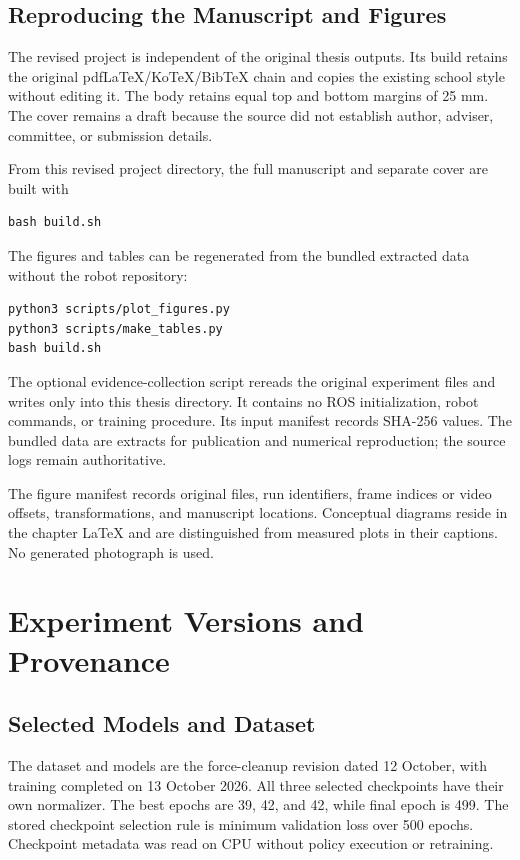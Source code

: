 \section{Reproducing the Manuscript and Figures}
The revised project is independent of the original thesis outputs. Its build retains the original pdfLaTeX/KoTeX/BibTeX chain and copies the existing school style without editing it. The body retains equal top and bottom margins of 25 mm. The cover remains a draft because the source did not establish author, adviser, committee, or submission details.

From this revised project directory, the full manuscript and separate cover are built with
\begin{verbatim}
bash build.sh
\end{verbatim}
The figures and tables can be regenerated from the bundled extracted data without the robot repository:
\begin{verbatim}
python3 scripts/plot_figures.py
python3 scripts/make_tables.py
bash build.sh
\end{verbatim}
The optional evidence-collection script rereads the original experiment files and writes only into this thesis directory. It contains no ROS initialization, robot commands, or training procedure. Its input manifest records SHA-256 values. The bundled data are extracts for publication and numerical reproduction; the source logs remain authoritative.

The figure manifest records original files, run identifiers, frame indices or video offsets, transformations, and manuscript locations. Conceptual diagrams reside in the chapter LaTeX and are distinguished from measured plots in their captions. No generated photograph is used.

\chapter{Experiment Versions and Provenance}
\label{app:provenance}

\section{Selected Models and Dataset}
The dataset and models are the force-cleanup revision dated 12 October, with training completed on 13 October 2026. All three selected checkpoints have their own normalizer. The best epochs are 39, 42, and 42, while final epoch is 499. The stored checkpoint selection rule is minimum validation loss over 500 epochs. Checkpoint metadata was read on CPU without policy execution or retraining.


